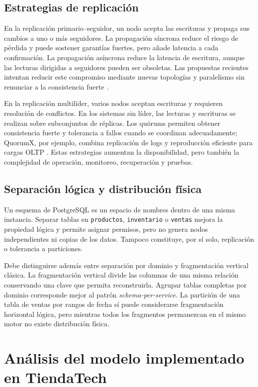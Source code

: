\documentclass[11pt,a4paper]{article}
\begin{document}
\subsection{Estrategias de replicación}

En la replicación primario--seguidor, un nodo acepta las escrituras y propaga sus cambios a uno o más seguidores. La propagación síncrona reduce el riesgo de pérdida y puede sostener garantías fuertes, pero añade latencia a cada confirmación. La propagación asíncrona reduce la latencia de escritura, aunque las lecturas dirigidas a seguidores pueden ser obsoletas. Las propuestas recientes intentan reducir este compromiso mediante nuevas topologías y paralelismo sin renunciar a la consistencia fuerte \cite{altukhaim2022multidirectional}.

En la replicación multilíder, varios nodos aceptan escrituras y requieren resolución de conflictos. En los sistemas sin líder, las lecturas y escrituras se realizan sobre subconjuntos de réplicas. Los quórums permiten obtener consistencia fuerte y tolerancia a fallos cuando se coordinan adecuadamente; QuorumX, por ejemplo, combina replicación de logs y reproducción eficiente para cargas OLTP \cite{wang2022quorumx}. Estas estrategias aumentan la disponibilidad, pero también la complejidad de operación, monitoreo, recuperación y pruebas.

\subsection{Separación lógica y distribución física}

Un esquema de PostgreSQL es un espacio de nombres dentro de una misma instancia. Separar tablas en \texttt{productos}, \texttt{inventario} o \texttt{ventas} mejora la propiedad lógica y permite asignar permisos, pero no genera nodos independientes ni copias de los datos. Tampoco constituye, por sí solo, replicación o tolerancia a particiones.

Debe distinguirse además entre separación por dominio y fragmentación vertical clásica. La fragmentación vertical divide las columnas de una misma relación conservando una clave que permita reconstruirla. Agrupar tablas completas por dominio corresponde mejor al patrón \emph{schema-per-service}. La partición de una tabla de ventas por rangos de fecha sí puede considerarse fragmentación horizontal lógica, pero mientras todos los fragmentos permanezcan en el mismo motor no existe distribución física.

\section{Análisis del modelo implementado en TiendaTech}
\end{document}
